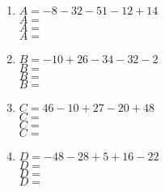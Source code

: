 \documentclass[11pt]{article}
\begin{document}
\begin{exercicedevoir}
\begin{multicols}{2}
\begin{enumerate}[itemsep=1em,label={}]
\item  $ A = -8-32-51-12+14$\\$ A =$ \\$ A =$\\$ A =$
\item  $ B = -10+26-34-32-2$\\$ B =$ \\$ B =$\\$ B =$
\item  $ C = 46-10+27-20+48$\\$ C =$ \\$ C =$\\$ C =$
\item  $ D = -48-28+5+16-22$\\$ D =$ \\$ D =$\\$ D =$
\end{enumerate}
\end{multicols}
\end{exercicedevoir}

\nonewpage
\end{document}
